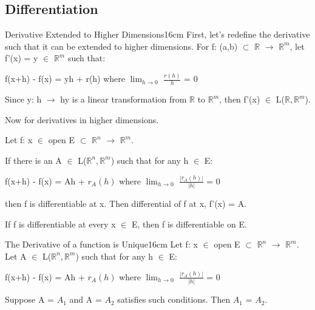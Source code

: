     \vspace{0.5cm}





\subsection{ Differentiation }

    \begin{definition}{Derivative Extended to Higher Dimensions}{16cm}
        First, let's redefine the derivative such that it can be extended to
        higher dimensions.
        For f: (a,b) $\subset$ $\mathbb{R}$ $\rightarrow$ $\mathbb{R}^m$,
        let f'(x) = y $\in$ $\mathbb{R}^m$ such that:

        \hspace{0.5cm}
        f(x+h) - f(x) = yh + r(h)
        \hspace{1cm}
        where $\lim_{h \rightarrow 0}$ $\frac{r(h)}{h}$ = 0

        Since y: h $\rightarrow$ hy is a linear transformation
        from $\mathbb{R}$ to $\mathbb{R}^m$, then
        f'(x) $\in$ L($\mathbb{R},\mathbb{R}^m$).

        \vspace{0.3cm}

        Now for derivatives in higher dimensions.
        
        Let f: x $\in$ open E $\subset$ $\mathbb{R}^n$ $\rightarrow$ $\mathbb{R}^m$.
        
        If there is an A $\in$ L($\mathbb{R}^n,\mathbb{R}^m$) such that
        for any h $\in$ E:

        \hspace{0.5cm}
        f(x+h) - f(x) = Ah + $r_A(h)$
        \hspace{1cm}
        where $\lim_{h \rightarrow 0}$ $\frac{|r_A(h)|}{|h|}$ = 0

        then f is {\color{lblue} differentiable} at x.
        Then {\color{lblue} differential} of f at x, f'(x) = A.

        If f is differentiable at every x $\in$ E, then f is differentiable on E.
    \end{definition}

    \vspace{0.5cm}



    \begin{wtheorem}{The Derivative of a function is Unique}{16cm}
        Let f: x $\in$ open E $\subset$ $\mathbb{R}^n$ $\rightarrow$ $\mathbb{R}^m$.
        Let A $\in$ L($\mathbb{R}^n,\mathbb{R}^m$) such that
        for any h $\in$ E:

        \hspace{0.5cm}
        f(x+h) - f(x) = Ah + $r_A(h)$
        \hspace{1cm}
        where $\lim_{h \rightarrow 0}$ $\frac{|r_A(h)|}{|h|}$ = 0

        Suppose A = $A_1$ and A = $A_2$ satisfies such conditions.
        Then $A_1$ = $A_2$.
    \end{wtheorem}

